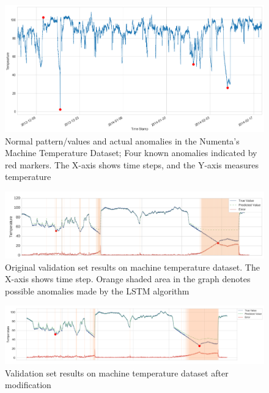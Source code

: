 \documentclass{article}
\begin{document}
\begin{figure}[htb]
	    \centering
\includegraphics[scale=0.21]{png/o-actualAnomalies.png}
    \caption{Normal pattern/values and actual anomalies in the Numenta’s
Machine Temperature Dataset; Four known anomalies indicated by red markers. The
X-axis shows time steps, and the Y-axis measures temperature}
    \label{fig:actualAnomalies}
\end{figure}

\begin{figure}[htb]
	    \centering
\includegraphics[scale=0.41]{png/o-validationResult.png}
    \caption{Original validation set results on machine temperature dataset. 
The X-axis shows time step. Orange shaded area in the graph denotes possible
anomalies made by the LSTM
algorithm}
    \label{fig:o-validationResult}
\end{figure}

\begin{figure}[htb]
	    \centering
\includegraphics[scale=0.26]{png/m-validationResult.png}
    \caption{Validation set results on machine temperature dataset after
modification}
    \label{fig:m-validationResult}
\end{figure}
\end{document}
